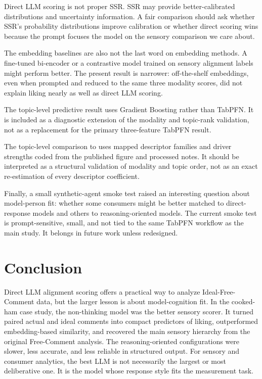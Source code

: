 \documentclass[12pt]{article}
\begin{document}
Direct LLM scoring is not proper SSR. SSR may provide better-calibrated distributions and uncertainty information. A fair comparison should ask whether SSR's probability distributions improve calibration or whether direct scoring wins because the prompt focuses the model on the sensory comparison we care about.

The embedding baselines are also not the last word on embedding methods. A fine-tuned bi-encoder or a contrastive model trained on sensory alignment labels might perform better. The present result is narrower: off-the-shelf embeddings, even when prompted and reduced to the same three modality scores, did not explain liking nearly as well as direct LLM scoring.

The topic-level predictive result uses Gradient Boosting rather than TabPFN. It is included as a diagnostic extension of the modality and topic-rank validation, not as a replacement for the primary three-feature TabPFN result.

The topic-level comparison to \citet{mahieu2022ifc} uses mapped descriptor families and driver strengths coded from the published figure and processed notes. It should be interpreted as a structural validation of modality and topic order, not as an exact re-estimation of every descriptor coefficient.

Finally, a small synthetic-agent smoke test raised an interesting question about model-person fit: whether some consumers might be better matched to direct-response models and others to reasoning-oriented models. The current smoke test is prompt-sensitive, small, and not tied to the same TabPFN workflow as the main study. It belongs in future work unless redesigned.

\section{Conclusion}

Direct LLM alignment scoring offers a practical way to analyze Ideal-Free-Comment data, but the larger lesson is about model-cognition fit. In the cooked-ham case study, the non-thinking model was the better sensory scorer. It turned paired actual and ideal comments into compact predictors of liking, outperformed embedding-based similarity, and recovered the main sensory hierarchy from the original Free-Comment analysis. The reasoning-oriented configurations were slower, less accurate, and less reliable in structured output. For sensory and consumer analytics, the best LLM is not necessarily the largest or most deliberative one. It is the model whose response style fits the measurement task.
\end{document}
